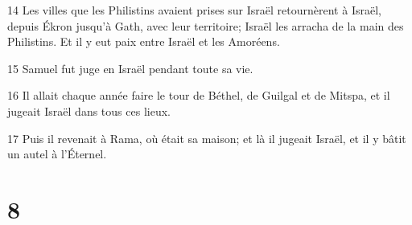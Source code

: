 \par 14 Les villes que les Philistins avaient prises sur Israël retournèrent à Israël, depuis Ékron jusqu'à Gath, avec leur territoire; Israël les arracha de la main des Philistins. Et il y eut paix entre Israël et les Amoréens.
\par 15 Samuel fut juge en Israël pendant toute sa vie.
\par 16 Il allait chaque année faire le tour de Béthel, de Guilgal et de Mitspa, et il jugeait Israël dans tous ces lieux.
\par 17 Puis il revenait à Rama, où était sa maison; et là il jugeait Israël, et il y bâtit un autel à l'Éternel.

\chapter{8}

